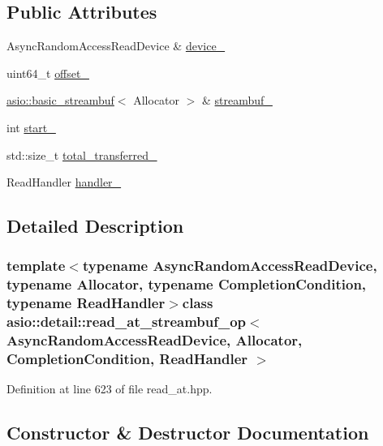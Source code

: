 \subsection*{Public Attributes}
\begin{DoxyCompactItemize}
\item 
Async\+Random\+Access\+Read\+Device \& \hyperlink{classasio_1_1detail_1_1read__at__streambuf__op_a60c858f679b7d2d30f466fe9a47905fa}{device\+\_\+}
\item 
uint64\+\_\+t \hyperlink{classasio_1_1detail_1_1read__at__streambuf__op_a4fab4da83a7cf41f75968f9df4510189}{offset\+\_\+}
\item 
\hyperlink{classasio_1_1basic__streambuf}{asio\+::basic\+\_\+streambuf}$<$ Allocator $>$ \& \hyperlink{classasio_1_1detail_1_1read__at__streambuf__op_affc19956d03f90f8f1874a862ebeb637}{streambuf\+\_\+}
\item 
int \hyperlink{classasio_1_1detail_1_1read__at__streambuf__op_aff5cf4e15b32e09e234e86edc88d2a91}{start\+\_\+}
\item 
std\+::size\+\_\+t \hyperlink{classasio_1_1detail_1_1read__at__streambuf__op_a98c198133eaab6a3ed97775658246976}{total\+\_\+transferred\+\_\+}
\item 
Read\+Handler \hyperlink{classasio_1_1detail_1_1read__at__streambuf__op_a73f01af5d9e981536d75e4dac0798a04}{handler\+\_\+}
\end{DoxyCompactItemize}


\subsection{Detailed Description}
\subsubsection*{template$<$typename Async\+Random\+Access\+Read\+Device, typename Allocator, typename Completion\+Condition, typename Read\+Handler$>$class asio\+::detail\+::read\+\_\+at\+\_\+streambuf\+\_\+op$<$ Async\+Random\+Access\+Read\+Device, Allocator, Completion\+Condition, Read\+Handler $>$}



Definition at line 623 of file read\+\_\+at.\+hpp.



\subsection{Constructor \& Destructor Documentation}
\hypertarget{classasio_1_1detail_1_1read__at__streambuf__op_a51fe77725685ac4b978bd80c5c6a7db8}{}
